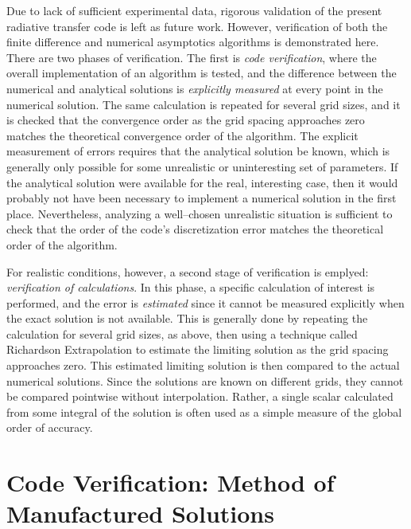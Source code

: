 \documentclass[ms,cpyr,lof,lot]{uathesis}
\begin{document}
Due to lack of sufficient experimental data, rigorous validation of the present radiative transfer code is left as future work.
However, verification of both the finite difference and numerical asymptotics algorithms is demonstrated here.
There are two phases of verification.
The first is \textit{code verification}, where the overall implementation of an algorithm is tested, and the difference between the numerical and analytical solutions is \textit{explicitly measured} at every point in the numerical solution.
The same calculation is repeated for several grid sizes, and it is checked that the convergence order as the grid spacing approaches zero matches the theoretical convergence order of the algorithm.
The explicit measurement of errors requires that the analytical solution be known, which is generally only possible for some unrealistic or uninteresting set of parameters.
If the analytical solution were available for the real, interesting case, then it would probably not have been necessary to implement a numerical solution in the first place.
Nevertheless, analyzing a well--chosen unrealistic situation is sufficient to check that the order of the code's discretization error matches the theoretical order of the algorithm.

For realistic conditions, however, a second stage of verification is emplyed: \textit{verification of calculations}.
In this phase, a specific calculation of interest is performed, and the error is \textit{estimated} since it cannot be measured explicitly when the exact solution is not available.
This is generally done by repeating the calculation for several grid sizes, as above, then using a technique called Richardson Extrapolation to estimate the limiting solution as the grid spacing approaches zero.
This estimated limiting solution is then compared to the actual numerical solutions.
Since the solutions are known on different grids, they cannot be compared pointwise without interpolation.
Rather, a single scalar calculated from some integral of the solution is often used as a simple measure of the global order of accuracy. %

\section{Code Verification: Method of Manufactured Solutions}
\end{document}
